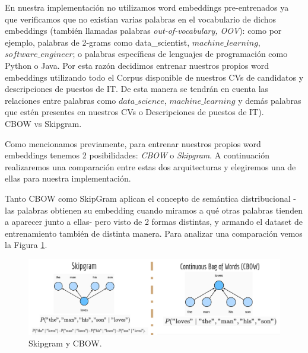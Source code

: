 \documentclass[12pt,a4paper]{article}
\makeatletter
\renewcommand\paragraph{\@startsection{paragraph}{4}{\z@}
            {-2.5ex\@plus -1ex \@minus -.25ex}
            {1.25ex \@plus .25ex}
            {\normalfont\normalsize\bfseries}}
\makeatother
\begin{document}
\begin{sloppypar}
\begin{enumerate}
\end{enumerate}

En nuestra implementación no utilizamos word embeddings pre-entrenados ya que verificamos que no existían varias palabras en el vocabulario de dichos embeddings (también llamadas palabras \textit{out-of-vocabulary, OOV}): como por ejemplo, palabras de 2-grams como data\_scientist, $machine\_learning$, $software\_engineer$; o palabras específicas de lenguajes de programación como Python o Java. Por esta razón decidimos entrenar nuestros propios word embeddings utilizando todo el Corpus disponible de nuestros CVs de candidatos y descripciones de puestos de IT. De esta manera se tendrán en cuenta las relaciones entre palabras como $data\_science$, $machine\_learning$ y demás palabras que estén presentes en nuestros CVs o Descripciones de puestos de IT).
\\

\paragraph{CBOW vs Skipgram.}\label{cbow_vs_skip}

Como mencionamos previamente, para entrenar nuestros propios word embeddings tenemos 2 posibilidades: \textit{CBOW} o \textit{Skipgram}. A continuación realizaremos una comparación entre estas dos arquitecturas y elegiremos una de ellas para nuestra implementación.

Tanto CBOW como SkipGram aplican el concepto de semántica distribucional -las palabras obtienen su embedding cuando miramos a qué otras palabras tienden a aparecer junto a ellas- pero visto de 2 formas distintas, y armando el dataset de entrenamiento también de distinta manera. Para analizar una comparación vemos la Figura \ref{fig:Imagen_NLP_15}.

\begin{figure}[H]    
 \centering
 \includegraphics[width=1\textwidth]{images/NLP/15.png}
 \caption{Skipgram y CBOW\cite{NLP_27}.}
 \label{fig:Imagen_NLP_15}
\end{figure}


\end{sloppypar}
\end{document}
